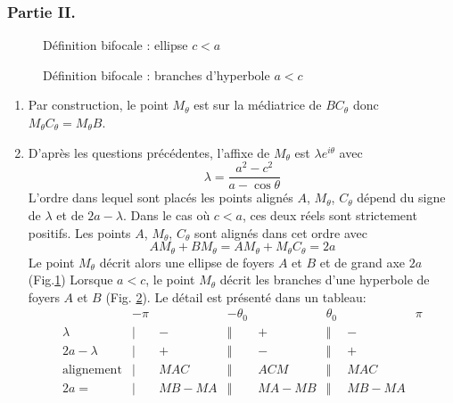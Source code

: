 \subsubsection*{Partie II.}
\begin{figure}[ht]
 \centering

\caption{Définition bifocale : ellipse $c<a$}
\label{fig:Cconi2_4}
\end{figure}
\begin{figure}[ht]
 \centering

\caption{Définition bifocale : branches d'hyperbole $a<c$}
\label{fig:Cconi2_5}
\end{figure}
\begin{enumerate}
 \item Par construction, le point $M_\theta$ est sur la médiatrice de $BC_\theta$ donc $M_\theta C_\theta=M_\theta B$. 
\item D'après les questions précédentes, l'affixe de $M_\theta$ est $\lambda e^{i\theta}$ avec 
\begin{displaymath}
 \lambda = \dfrac{a^2-c^2}{a-\cos \theta}
\end{displaymath}
L'ordre dans lequel sont placés les points alignés $A$, $M_\theta$, $C_\theta$ dépend du signe de $\lambda$ et de $2a-\lambda$.\newline
Dans le cas où $c<a$, ces deux réels sont strictement positifs. Les points $A$, $M_\theta$, $C_\theta$ sont alignés dans cet ordre avec
\begin{displaymath}
 AM_\theta + BM_\theta = AM_\theta + M_\theta C_\theta = 2a
\end{displaymath}
Le point $M_\theta$ décrit alors une ellipse de foyers $A$ et $B$ et de grand axe $2a$ (Fig.\ref{fig:Cconi2_4})\newline
Lorsque $a<c$, le point $M_\theta$ décrit les branches d'une hyperbole de foyers $A$ et $B$ (Fig. \ref{fig:Cconi2_5}). Le détail est présenté dans un tableau:
\begin{displaymath}
\begin{array}{cccccccc}
             &-\pi &   & -\theta_0 &   & \theta_0 &   & \pi \\ \hline
     \lambda & |   & - &   \Vert  & + & \Vert    & - &  \\ \hline
 2a- \lambda & |   & + &   \Vert  & - & \Vert    & + &  \\ \hline
\text{alignement} & |   & MAC &   \Vert  & ACM & \Vert    & MAC &  \\ \hline
2a= & |   & MB -MA &   \Vert  & MA-MB & \Vert &  MB -MA &  
\end{array}
 \end{displaymath}
\end{enumerate}

